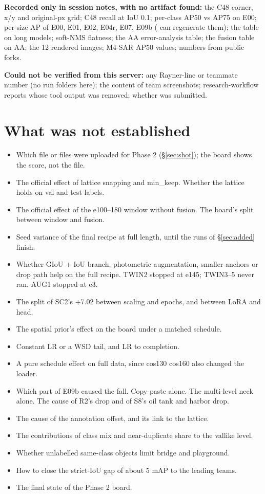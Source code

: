 \textbf{Recorded only in session notes, with no artifact found:} the C48 corner, x/y and original-px grid; C48 recall at IoU 0.1; per-class AP50 vs AP75 on E00; per-size AP of E00, E01, E02, E04r, E07, E09b ( can regenerate them); the \lam{} table on long models; soft-NMS flatness; the AA error-analysis table; the fusion table on AA; the 12 rendered images; M4-SAR AP50 values; numbers from public forks.

\textbf{Could not be verified from this server:} any Rayner-line or teammate number (no run folders here); the content of team screenshots; research-workflow reports whose tool output was removed; whether  was submitted.

\section{What was not established}
\label{sec:notestablished}

\begin{itemize}\setlength{\itemsep}{1pt}
\item Which file or files were uploaded for Phase 2 (\S\ref{sec:shot}); the board shows the score, not the file.
\item The official effect of lattice snapping and min\_keep. Whether the lattice holds on val and test labels.
\item The official effect of the e100--180 window without fusion. The board's split between window and fusion.
\item Seed variance of the final recipe at full length, until the runs of \S\ref{sec:added} finish.
\item Whether GIoU + IoU branch, photometric augmentation, smaller anchors or drop path help on the full recipe. TWIN2 stopped at e145; TWIN3--5 never ran. AUG1 stopped at e3.
\item The split of SC2's +7.02 between scaling and epochs, and between LoRA and head.
\item The spatial prior's effect on the board under a matched schedule.
\item Constant LR or a WSD tail, and LR  to completion.
\item A pure schedule effect on full data, since cos130 \to{} cos160 also changed the loader.
\item Which part of E09b caused the fall. Copy-paste alone. The multi-level neck alone. The cause of R2's drop and of S8's oil tank and harbor drop.
\item The cause of the annotation offset, and its link to the lattice.
\item The contributions of class mix and near-duplicate share to the vallike level.
\item Whether unlabelled same-class objects limit bridge and playground.
\item How to close the strict-IoU gap of about 5 mAP to the leading teams.
\item The final state of the Phase 2 board.
\end{itemize}

